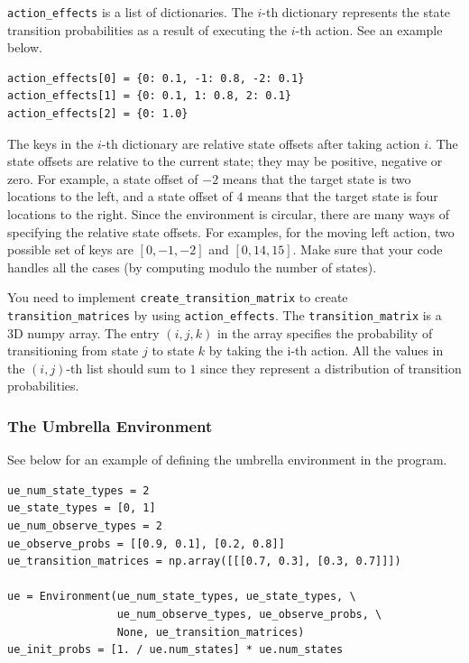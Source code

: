 \documentclass[12pt]{article}
\begin{document}
\verb+action_effects+ is a list of dictionaries. The $i$-th dictionary represents the state transition probabilities as a result of executing the $i$-th action. See an example below.
%
\begin{verbatim}
action_effects[0] = {0: 0.1, -1: 0.8, -2: 0.1}
action_effects[1] = {0: 0.1, 1: 0.8, 2: 0.1}
action_effects[2] = {0: 1.0}
\end{verbatim}
%
The keys in the $i$-th dictionary are relative state offsets after taking action $i$. The state offsets are relative to the current state; they may be positive, negative or zero. For example, a state offset of $-2$ means that the target state is two locations to the left, and a state offset of $4$ means that the target state is four locations to the right. Since the environment is circular, there are many ways of specifying the relative state offsets. For examples, for the moving left action, two possible set of keys are $[0, -1, -2]$ and $[0, 14, 15]$. Make sure that your code handles all the cases (by computing modulo the number of states).

You need to implement \verb+create_transition_matrix+ to create \verb+transition_matrices+ by using \verb+action_effects+.  The \verb+transition_matrix+ is a 3D numpy array. The entry $(i,j,k)$ in the array specifies the probability of transitioning from state $j$ to state $k$ by taking the i-th action. All the values in the $(i,j)$-th list should sum to $1$ since they represent a distribution of transition probabilities.

\subsubsection{The Umbrella Environment}

See below for an example of defining the umbrella environment in the program.
\begin{verbatim}
ue_num_state_types = 2
ue_state_types = [0, 1]  
ue_num_observe_types = 2
ue_observe_probs = [[0.9, 0.1], [0.2, 0.8]]
ue_transition_matrices = np.array([[[0.7, 0.3], [0.3, 0.7]]]) 

ue = Environment(ue_num_state_types, ue_state_types, \
                 ue_num_observe_types, ue_observe_probs, \
                 None, ue_transition_matrices)
ue_init_probs = [1. / ue.num_states] * ue.num_states
\end{verbatim}
\end{document}
